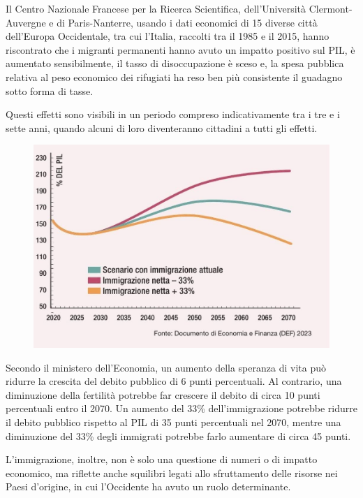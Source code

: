 \documentclass[12pt]{book} %
\begin{document}
Il Centro Nazionale Francese per la Ricerca Scientifica, dell'Università Clermont-Auvergne e di Paris-Nanterre, usando i
dati economici di 15 diverse città dell'Europa Occidentale, tra cui l'Italia, raccolti tra il 1985
e il 2015, hanno riscontrato che i migranti permanenti hanno avuto un impatto
positivo sul PIL, è aumentato sensibilmente, il tasso di disoccupazione è sceso e, la
spesa pubblica relativa al peso economico dei rifugiati ha reso ben più consistente il guadagno sotto forma di
tasse.

Questi effetti sono visibili in un periodo compreso indicativamente tra i tre e i sette
anni, quando alcuni di loro diventeranno cittadini a tutti gli effetti.

\needspace{4cm}
\begin{figure}[H]
  \centering
  \includegraphics[width=0.95\linewidth]{images/Libro-img057.jpg}
\end{figure}

Secondo il ministero dell'Economia, un aumento della speranza di vita può ridurre la crescita del debito pubblico di 6 punti percentuali. Al contrario, una diminuzione della fertilità potrebbe far crescere il debito di circa 10 punti percentuali entro il 2070. Un aumento del 33\% dell'immigrazione potrebbe ridurre il debito pubblico rispetto al PIL di 35 punti percentuali nel 2070, mentre una diminuzione del 33\% degli immigrati potrebbe farlo aumentare di circa 45 punti.

L’immigrazione, inoltre, non è solo una questione di numeri o di impatto economico, ma riflette anche squilibri legati allo sfruttamento delle risorse nei Paesi d’origine, in cui l’Occidente ha avuto un ruolo determinante.
\end{document}
